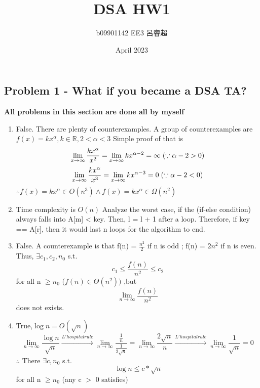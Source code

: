 \documentclass{article}
\title{DSA HW1}
\author{b09901142 EE3 呂睿超}
\date{April 2023}
\begin{document}
\begin{CJK*}{UTF8}{bsmi}
\maketitle

\section{Problem 1 - What if you became a DSA TA?}
\textbf{All problems in this section are done all by myself}
\begin{enumerate}
    \item False. There are plenty of counterexamples. A group of counterexamples are $f(x) = kx^\alpha , k\in \mathbb{R}, 2 <\alpha < 3 $ Simple proof of that is \[ \lim_{x\to\infty} \frac{kx^\alpha}{x^2} = \lim_{x\to\infty} kx^{\alpha -2} = \infty \hspace{0.1cm} (\because \alpha-2 > 0)\] 
    \[ \lim_{x\to\infty} \frac{kx^\alpha}{x^3} = \lim_{x\to\infty} kx^{\alpha -3} = 0 \hspace{0.1cm} (\because \alpha-2 < 0)\] 
    $\therefore f(x) = kx^\alpha \in O(n^3) \land f(x) = kx^\alpha \in \Omega(n^2) $

    \item Time complexity is $O(n)$  Analyze the worst case, if the (if-else condition) always falls into A[m] < key. Then, l = l + 1 after a loop. Therefore, if key == A[r], then it would last n loops for the algorithm to end.

    \item False. A counterexample is that f(n) = $\frac{n^2}{2}$ if n is odd ;  f(n) = $2n^2$ if n is even. Thus, $\exists c_1,c_2,n_0 $ s.t.  \[ c_1 \leq \frac{f(n)}{n^2} \leq c_2 \] for all n $\geq n_0$ ($f(n) \in \Theta(n^2))$ ,but \[ \lim_{n\to\infty} \frac{f(n)}{n^2}\] does not exists.

    \item True,$\log{n} = O(\sqrt{n})$ \[\lim_{n\to\infty} \frac{\log{n}}{\sqrt{n}} \xrightarrow{L'hospital rule} \lim_{n\to\infty} \frac{\frac{1}{n}}{\frac{1}{2\sqrt{n}}}  = \lim_{n\to\infty} \frac{2\sqrt{n}}{{n}}  \xrightarrow{L'hospital rule} \lim_{n\to\infty} \frac{1}{\sqrt{n}} = 0\]$\therefore$ There $\exists c,n_0$ s.t. \[\ \log{n} \leq c*\sqrt{n} \] for all n $\geq n_0$ (any c $>$ 0 satisfies)


\end{enumerate}
\end{CJK*}
\end{document}
